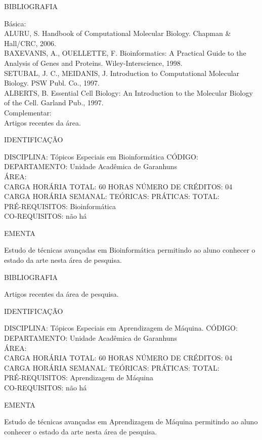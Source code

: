 \documentclass[
	12pt,				%
	openright,			%
  oneside,     %
	a4paper,			%
	chapter=TITLE,		%
	english,			%
	french,				%
	spanish,			%
	brazil				%
	]{abntex2}
\begin{document}
\begin{apendicesenv}
BIBLIOGRAFIA 

Básica:\\
ALURU, S. Handbook of Computational Molecular Biology. Chapman \& Hall/CRC, 2006.\\
BAXEVANIS, A., OUELLETTE, F. Bioinformatics: A Practical Guide to the Analysis of Genes and Proteins. Wiley-Interscience, 1998.\\
SETUBAL, J. C., MEIDANIS, J. Introduction to Computational Molecular Biology. PSW Publ. Co., 1997.\\
ALBERTS, B. Essential Cell Biology: An Introduction to the Molecular Biology of the Cell. Garland Pub., 1997.\\
Complementar:\\
Artigos recentes da área.

\newpage IDENTIFICAÇÃO

DISCIPLINA: Tópicos Especiais em Bioinformática CÓDIGO:\\ 
DEPARTAMENTO: Unidade Acadêmica de Garanhuns\\
ÁREA: \\
CARGA HORÁRIA TOTAL: 60 HORAS NÚMERO DE CRÉDITOS: 04\\
CARGA HORÁRIA SEMANAL: TEÓRICAS: PRÁTICAS: TOTAL: \\
PRÉ-REQUISITOS: Bioinformática\\
CO-REQUISITOS: não há

EMENTA 

Estudo de técnicas avançadas em Bioinformática permitindo ao aluno conhecer o estado da arte nesta área de pesquisa.

BIBLIOGRAFIA 

Artigos recentes da área de pesquisa.

\newpage IDENTIFICAÇÃO

DISCIPLINA: Tópicos Especiais em Aprendizagem de Máquina. CÓDIGO:\\ 
DEPARTAMENTO: Unidade Acadêmica de Garanhuns\\ 
ÁREA: \\
CARGA HORÁRIA TOTAL: 60 HORAS NÚMERO DE CRÉDITOS: 04\\
CARGA HORÁRIA SEMANAL: TEÓRICAS: PRÁTICAS: TOTAL: \\
PRÉ-REQUISITOS: Aprendizagem de Máquina\\
CO-REQUISITOS: não há

EMENTA 

Estudo de técnicas avançadas em Aprendizagem de Máquina permitindo ao
aluno conhecer o estado da arte nesta área de pesquisa.


\end{apendicesenv}
\end{document}
